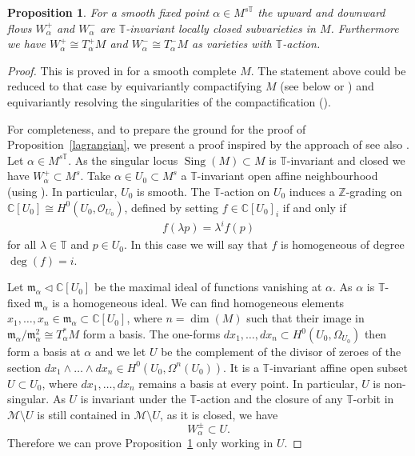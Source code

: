 \documentclass[12pt]{article}
\numberwithin{equation}{section}
\newtheorem{proposition}[theorem]{Proposition}
\theoremstyle{remark}
\theoremstyle{definition}
\numberwithin{theorem}{section}
\def\beq{\begin{eqnarray}}
\def\eeq{\end{eqnarray}}
\def\C{\mathbb{C}}
\def\M{{\mathcal{M}}}
\def\calF{{\mathcal{F}}}
\newcommand{\T}{{\mathbb{T}}}
\def\calO{{\mathcal O}}
\def\Z{\mathbb{Z}}
\def\m{{\mathfrak m}}
\renewcommand{\1}{\mathbbm{1}}
\begin{document}
\begin{proposition}\label{bbprop} For a smooth fixed point $\alpha\in M^{s\T}$ the upward and downward flows  $W^+_\alpha$ and $W^-_\alpha$ are $\T$-invariant locally closed subvarieties in $M$. Furthermore we have $W^+_\alpha \cong T^+_\alpha M$ and $W^-_\alpha\cong T^-_\alpha M$ as varieties with $\T$-action.  \end{proposition}
\begin{proof} This is proved in \cite{bialynicki-birula} for a smooth complete $M$. The statement above could be reduced to that case by equivariantly compactifying $M$ (see below or \cite[Theorem 3]{sumihiro}) and equivariantly resolving the singularities of the compactification (\cite[Corollary 7.6.3]{villamayor}). 
	
	For completeness, and to prepare the ground for the proof of Proposition~\ref{lagrangian}, we present a proof  inspired by the approach of \cite[Lemma 2.2]{bellamy-etal} see also \cite[\S 1]{drinfeld3}.  
	Let $\alpha\in M^{s\T}$.  As the singular locus $\operatorname{Sing}(M)\subset M$ is $\T$-invariant and closed we have   $W^+_\alpha\subset M^s$. Take $\alpha\in U_0\subset M^s$  a $\T$-invariant open affine neighbourhood (using \cite[Corollary 2]{sumihiro}). In particular, $U_0$ is smooth.  The $\T$-action on $U_0$ induces a $\Z$-grading on $\C[U_0]\cong H^0(U_0,\calO_{U_0})$, defined by setting $f\in \C[U_0]_i$ if and only if \beq\label{transrule}f(\lambda p)=\lambda^if(p)\eeq for all $\lambda \in \T$ and $p\in U_0$. In this case we will say that $f$ is homogeneous of degree $\deg(f)=i$. 
	
	Let $\m_\alpha\triangleleft \C[U_0]$ be the maximal ideal of functions vanishing at $\alpha$. As $\alpha$ is $\T$-fixed $\m_\alpha$ is a homogeneous ideal. We can find homogeneous elements $x_1,\dots,x_{n}\in \m_\alpha\subset \C[U_0]$, where $n=\dim(M)$ such that their image  in $\m_\alpha/\m_\alpha^2\cong T^*_\alpha M$ form a basis. The one-forms $dx_1,\dots, dx_n\subset H^0(U_0,\Omega_{U_0})$ then form a basis at $\alpha$ and we let $U$ be the complement of the divisor of zeroes of the section $dx_1\wedge\dots\wedge dx_n\in H^0(U_0,\Omega^n(U_0))$. It is a $\T$-invariant affine open subset $U\subset U_0$, where $dx_1,\dots, dx_n$ remains a basis at every point. In particular, $U$ is non-singular. 
	As $U$ is invariant under the $\T$-action and the closure of any $\T$-orbit in $\M\setminus U$ is still contained in $\M\setminus U$, as it is closed,  we have   $$W^{\pm}_\alpha \subset U.$$ Therefore we can prove Proposition~\ref{bbprop} only working in $U$.
	

\end{proof}
\end{document}
